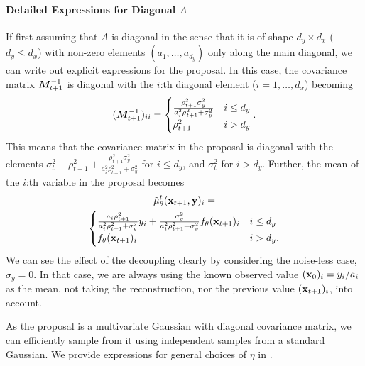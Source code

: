 \documentclass{proc}
\begin{document}
\paragraph{Detailed Expressions for Diagonal $A$}
If first assuming that $A$ is diagonal in the sense that it is of shape $d_y \times d_x$ ($d_y \leq d_x$) with non-zero elements $(a_1, \dots, a_{d_y})$ only along the main diagonal, we can write out explicit expressions for the proposal. In this case, the covariance matrix ${\bm{M}}_{t+1}^{-1}$ is diagonal with the $i$:th diagonal element ($i=1, \dots, d_x$) becoming
\begin{align}
    ({\bm{M}}_{t+1}^{-1})_{ii} = 
    \begin{cases}
    \frac{\rho_{t+1}^2\sigma_y^2}{a_i^2\rho_{t+1}^2 + \sigma_y^2} & i\leq d_y\\
    \rho_{t+1}^2 & i>d_y
    \end{cases}.
\end{align}
This means that the covariance matrix in the proposal is diagonal with the elements $\sigma_t^2 - \rho_{t+1}^2 + \frac{\rho_{t+1}^2\sigma_y^2}{a_i^2\rho_{t+1}^2 + \sigma_y^2}$ for $i\leq d_y$, and $\sigma_t^2$ for $i> d_y$. Further, the mean of the $i$:th variable in the proposal becomes
\begin{multline}
    \tilde \mu_\theta^t(\mathbf{x}_{t+1}, \mathbf{y})_i =  \\
    \begin{cases}
    \frac{a_i\rho_{t+1}^2}{a_i^2\rho_{t+1}^2 + \sigma_y^2} y_i + \frac{\sigma_y^2}{a_i^2\rho^2_{t+1} + \sigma_y^2}f_\theta(\mathbf{x}_{t+1})_i & i\leq d_y \\
    f_\theta(\mathbf{x}_{t+1})_i & i>d_y.
    \end{cases}
\end{multline}
We can see the effect of the decoupling clearly by considering the noise-less case, $\sigma_y=0$. In that case, we are always using the known observed value $(\mathbf{x}_0)_i=y_i/a_i$ as the mean, not taking the reconstruction, nor the previous value $(\mathbf{x}_{t+1})_i$, into account. 

As the proposal is a multivariate Gaussian with diagonal covariance matrix, we can efficiently sample from it using independent samples from a standard Gaussian. We provide expressions for general choices of $\eta$ in .
\end{document}
